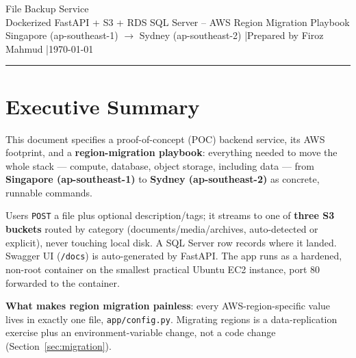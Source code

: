 \documentclass[10pt]{article}
\newcommand{\code}[1]{\texttt{\small\color{accentTeal}#1}}
\begin{document}
\sloppy

\begin{center}
  {\headingfont\LARGE\color{headColor} File Backup Service}\\[0.2em]
  {\lightfont\normalsize\color{accentTeal} Dockerized FastAPI + S3 + RDS SQL Server -- AWS Region Migration Playbook}\\[0.2em]
  {\small\color{commentColor} Singapore (ap-southeast-1) $\rightarrow$ Sydney (ap-southeast-2) \quad|\quad Prepared by Firoz Mahmud \quad|\quad \today}
\end{center}
\vspace{0.3em}
\hrule
\vspace{0.6em}

\tableofcontents
\thispagestyle{fancy}
\vspace{0.5em}

\section{Executive Summary}

This document specifies a proof-of-concept (POC) backend service, its AWS
footprint, and a \textbf{region-migration playbook}: everything needed to
move the whole stack --- compute, database, object storage, including data
--- from \textbf{Singapore (ap-southeast-1)} to \textbf{Sydney
(ap-southeast-2)} as concrete, runnable commands.

Users \code{POST} a file plus optional description/tags; it streams to one
of \textbf{three S3 buckets} routed by category (documents/media/archives,
auto-detected or explicit), never touching local disk. A SQL Server row
records where it landed. Swagger UI (\code{/docs}) is auto-generated by
FastAPI. The app runs as a hardened, non-root container on the smallest
practical Ubuntu EC2 instance, port 80 forwarded to the container.

\textbf{What makes region migration painless}: every AWS-region-specific
value lives in exactly one file, \code{app/config.py}. Migrating regions is
a data-replication exercise plus an environment-variable change, not a code
change (Section~\ref{sec:migration}).
\end{document}
